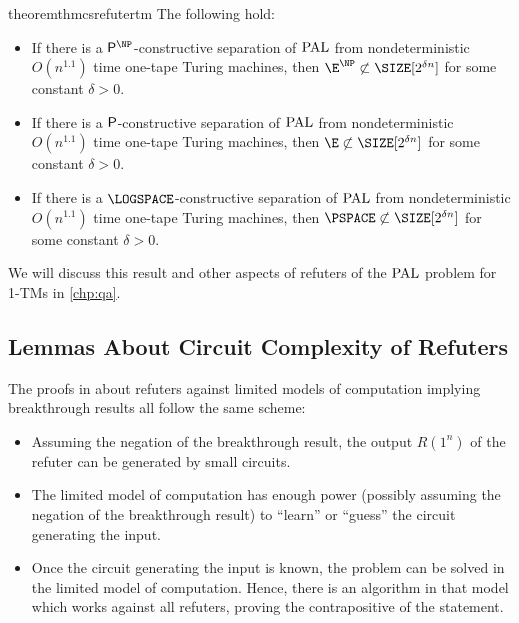 \begin{restatable}{theorem}{thmcsrefutertm}\label{thm:csrefutertm} 
The following hold:
	\begin{itemize}
	    \item If there is a $\PTIME^{\NP}$-constructive separation of $\mathrm{PAL}$
		from nondeterministic $O(n^{1.1})$ time one-tape Turing machines, then
		$\E^{\NP} \not \subset \SIZE[2^{\delta n}]$ for some constant $\delta >0$.
	    
        \item If there is a $\mathsf{P}$-constructive separation of $\mathrm{PAL}$ 
		from nondeterministic $O(n^{1.1})$ time one-tape Turing machines, then
		 $\E \not \subset \SIZE[2^{\delta n}]$ for some constant $\delta >0$.
        
        \item If there is a $\LOGSPACE$-constructive separation of $\mathrm{PAL}$ 
		from nondeterministic $O(n^{1.1})$ time one-tape Turing machines, then
		 $\PSPACE \not \subset \SIZE[2^{\delta n}]$ for some constant $\delta >0$.
	\end{itemize}
\end{restatable}

We will discuss this result and other aspects of refuters of the $\mathrm{PAL}$ problem 
for 1-TMs in \cref{chp:qa}.

\subsection{Lemmas About Circuit Complexity of Refuters}


The proofs in \cite{ConstructiveSeparations} about refuters against limited models of computation 
implying breakthrough results all follow the same scheme:

\begin{itemize}
	\item Assuming the negation of the breakthrough result, the output $R(1^n)$ of the refuter
	can be generated by small circuits.
	\item The limited model of computation has enough power (possibly assuming the negation
	of the breakthrough result) to ``learn'' or ``guess'' the circuit generating the input. 
	\item Once the circuit generating the input is known, the problem can be solved in 
	the limited model of computation. Hence, there is an algorithm in that model which works 
	against all refuters, proving the contrapositive of the statement. 
\end{itemize}

